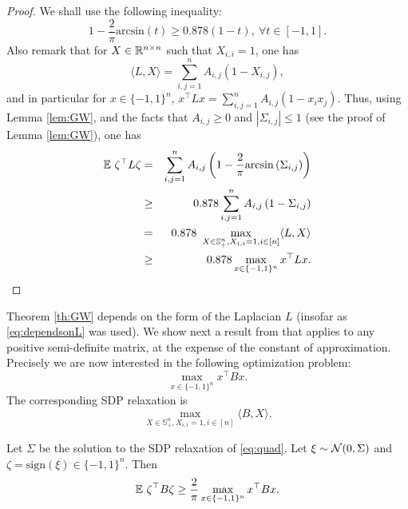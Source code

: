 \begin{proof}
We shall use the following inequality:
\begin{equation} \label{eq:dependsonL}
1 - \frac{2}{\pi} \mathrm{arcsin}(t) \geq 0.878 (1-t), \ \forall t \in [-1,1] .
\end{equation}
Also remark that for $X \in \mathbb{R}^{n \times n}$ such that $X_{i,i}=1$, one has
$$\langle L, X \rangle = \sum_{i,j=1}^n A_{i,j} (1 - X_{i,j}) ,$$
and in particular for $x \in \{-1,1\}^n$, $x^{\top} L x = \sum_{i,j=1}^n A_{i,j} (1 - x_i x_j)$.
Thus, using Lemma \ref{lem:GW}, and the facts that $A_{i,j} \geq 0$ and $|\Sigma_{i,j}| \leq 1$ (see the proof of Lemma \ref{lem:GW}), one has
\begin{eqnarray*}
\mathbb{E} \ \zeta^{\top} L \zeta
& = & \sum_{i,j=1}^n A_{i,j} \left(1- \frac{2}{\pi} \mathrm{arcsin} \left(\Sigma_{i,j}\right)\right)  \\
& \geq & 0.878 \sum_{i,j=1}^n A_{i,j} \left(1- \Sigma_{i,j}\right) \\
& = & 0.878 \ \max_{X \in \mathbb{S}_+^n, X_{i,i}=1, i \in [n]} \langle L, X \rangle \\
& \geq & 0.878 \max_{x \in \{-1,1\}^n} x^{\top} L x .
\end{eqnarray*}
\end{proof}

Theorem \ref{th:GW} depends on the form of the Laplacian $L$ (insofar as \eqref{eq:dependsonL} was used). We show next a result from \cite{Nes97} that applies to any positive semi-definite matrix, at the expense of the constant of approximation. Precisely we are now interested in the following optimization problem:
\begin{equation} \label{eq:quad}
\max_{x \in \{-1,1\}^n} x^{\top} B x .
\end{equation}
The corresponding SDP relaxation is
$$\max_{X \in \mathbb{S}_+^n, X_{i,i}=1, i \in [n]} \langle B, X \rangle .$$

\begin{theorem}
Let $\Sigma$ be the solution to the SDP relaxation of \eqref{eq:quad}. Let $\xi \sim \mathcal{N}(0, \Sigma)$ and $\zeta = \mathrm{sign}(\xi) \in \{-1,1\}^n$. Then
$$\mathbb{E} \ \zeta^{\top} B \zeta \geq \frac{2}{\pi} \max_{x \in \{-1,1\}^n} x^{\top} B x .$$
\end{theorem}

